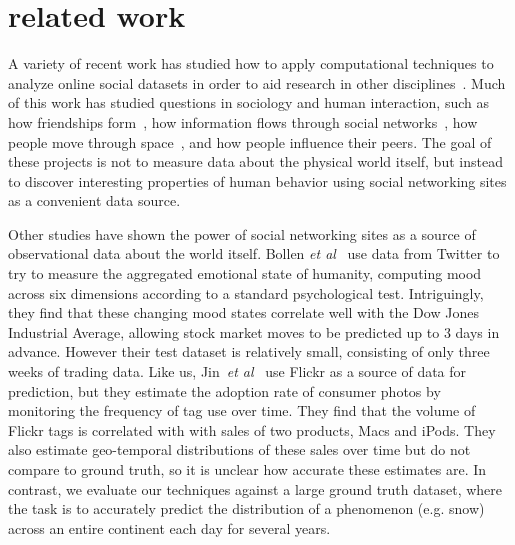 \section{related work}

A variety of recent work has studied how to apply computational
techniques to analyze online social datasets in order to aid research
in other disciplines~\cite{lazer09}. Much of this work has studied
questions in sociology and human interaction, such as how friendships
form~\cite{feedback08kdd}, how information flows through social
networks~\cite{libennowell08}, how people move through
space~\cite{brockmann06}, and how people influence their
peers\cite{anagnostpopoulos08}.  The goal of these projects is not to
measure data about the physical world itself, but instead to discover
interesting properties of human behavior using social networking sites
as a convenient data source.

Other studies have shown the power of social networking sites as a
source of observational data about the world itself.  Bollen
\textit{et al}~\cite{bollen11twitter} use data from Twitter to try to measure
the aggregated emotional state of humanity, computing mood across six
dimensions according to a standard psychological
test. Intriguingly, they find that these changing mood states
correlate well with the Dow Jones Industrial Average, allowing stock
market moves to be predicted up to 3 days in advance.  However their
test dataset is relatively small, consisting of only three weeks of
trading data.  Like us, Jin~\textit{et al}~\cite{jin10prediction} use
Flickr as a source of data for prediction, but they estimate the
adoption rate of consumer photos by monitoring the frequency of tag
use over time. They find that the volume of Flickr tags is 
correlated  with with sales of two products, Macs and iPods. They also
estimate geo-temporal distributions of these sales over time but do
not compare to ground truth, so it is unclear how accurate these
estimates are. In contrast, we evaluate our techniques against a large
ground truth dataset, where the task is to accurately predict the
distribution of a phenomenon (e.g. snow) across an entire continent 
each day for several years.


